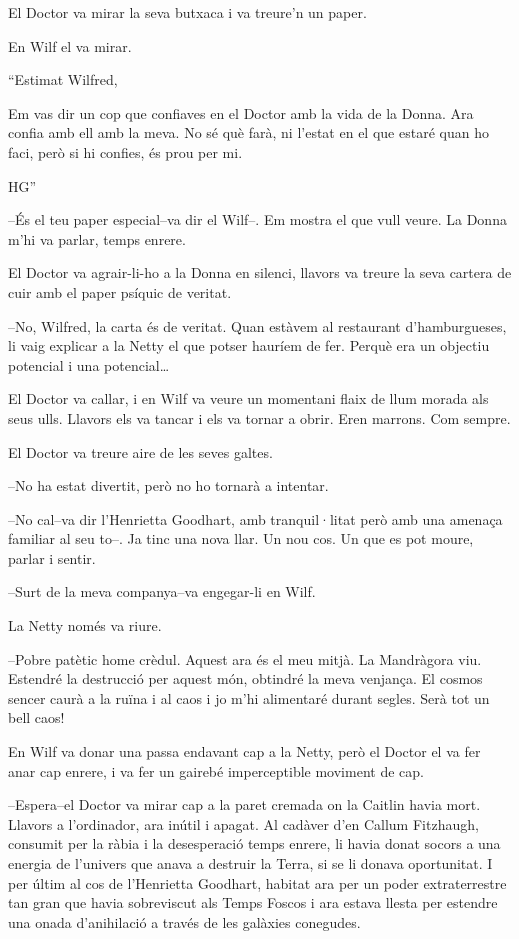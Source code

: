 El Doctor va mirar la seva butxaca i va treure'n un paper.

En Wilf el va mirar.

``Estimat Wilfred,

Em vas dir un cop que confiaves en el Doctor amb la vida de la Donna.
Ara confia amb ell amb la meva. No sé què farà, ni l'estat en el que
estaré quan ho faci, però si hi confies, és prou per mi.

HG''

--És el teu paper especial--va dir el Wilf--. Em mostra el que vull
veure. La Donna m'hi va parlar, temps enrere.

El Doctor va agrair-li-ho a la Donna en silenci, llavors va treure la
seva cartera de cuir amb el paper psíquic de veritat.

--No, Wilfred, la carta és de veritat. Quan estàvem al restaurant
d'hamburgueses, li vaig explicar a la Netty el que potser hauríem de
fer. Perquè era un objectiu potencial i una potencial\ldots{}

El Doctor va callar, i en Wilf va veure un momentani flaix de llum
morada als seus ulls. Llavors els va tancar i els va tornar a obrir.
Eren marrons. Com sempre.

El Doctor va treure aire de les seves galtes.

--No ha estat divertit, però no ho tornarà a intentar.

--No cal--va dir l'Henrietta Goodhart, amb tranquil·litat però amb una
amenaça familiar al seu to--. Ja tinc una nova llar. Un nou cos. Un que
es pot moure, parlar i sentir.

--Surt de la meva companya--va engegar-li en Wilf.

La Netty només va riure.

--Pobre patètic home crèdul. Aquest ara és el meu mitjà. La Mandràgora
viu. Estendré la destrucció per aquest món, obtindré la meva venjança.
El cosmos sencer caurà a la ruïna i al caos i jo m'hi alimentaré durant
segles. Serà tot un bell caos!

En Wilf va donar una passa endavant cap a la Netty, però el Doctor el va
fer anar cap enrere, i va fer un gairebé imperceptible moviment de cap.

--Espera--el Doctor va mirar cap a la paret cremada on la Caitlin havia
mort. Llavors a l'ordinador, ara inútil i apagat. Al cadàver d'en Callum
Fitzhaugh, consumit per la ràbia i la desesperació temps enrere, li
havia donat socors a una energia de l'univers que anava a destruir la
Terra, si se li donava oportunitat. I per últim al cos de l'Henrietta
Goodhart, habitat ara per un poder extraterrestre tan gran que havia
sobreviscut als Temps Foscos i ara estava llesta per estendre una onada
d'anihilació a través de les galàxies conegudes.

